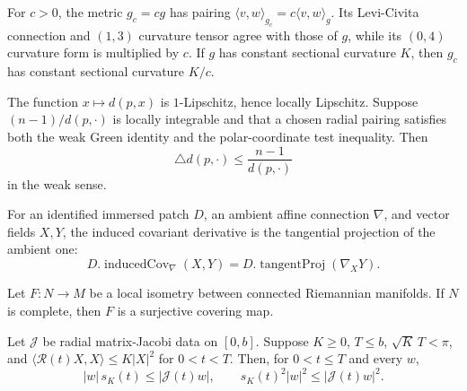\begin{lemma}
\label{lem:constant-rescaling-connection-curvature}


For $c>0$, the metric $g_c=cg$ has pairing
$\langle v,w\rangle_{g_c}=c\langle v,w\rangle_g$.  Its Levi-Civita
connection and $(1,3)$ curvature tensor agree with those of $g$, while
its $(0,4)$ curvature form is multiplied by $c$.  If $g$ has constant
sectional curvature $K$, then $g_c$ has constant sectional curvature
$K/c$.
\end{lemma}

\begin{lemma}
\label{lem:distance-function-weak-laplacian-reduction}


The function $x\mapsto d(p,x)$ is $1$-Lipschitz, hence locally
Lipschitz.  Suppose $(n-1)/d(p,\cdot)$ is locally integrable and
that a chosen radial pairing satisfies both the weak Green identity
and the polar-coordinate test inequality.  Then
$$\triangle d(p,\cdot)\le \frac{n-1}{d(p,\cdot)}$$
in the weak sense.
\end{lemma}

\begin{lemma}
\label{lem:immersed-patch-induced-connection}


For an identified immersed patch $D$, an ambient affine connection
$\nabla$, and vector fields $X,Y$, the induced covariant derivative is
the tangential projection of the ambient one:
$$D.\operatorname{inducedCov}_{\nabla}(X,Y)
=D.\operatorname{tangentProj}(\nabla_XY).$$
\end{lemma}

\begin{lemma}
\label{lem:local-isometry-covering-connected-source}


Let $F\colon N\to M$ be a local isometry between connected Riemannian
manifolds.  If $N$ is complete, then $F$ is a surjective covering map.
\end{lemma}

\begin{lemma}
\label{lem:matrix-jacobi-rauch-lower}


Let $\mathcal J$ be radial matrix-Jacobi data on $[0,b]$.  Suppose
$K\ge0$, $T\le b$, $\sqrt K\,T<\pi$, and
$\langle\mathcal R(t)X,X\rangle\le K|X|^2$ for $0<t<T$.
Then, for $0<t\le T$ and every $w$,
$$|w|\,s_K(t)\le|\mathcal J(t)w|,
\qquad s_K(t)^2|w|^2\le|\mathcal J(t)w|^2.$$
\end{lemma}

